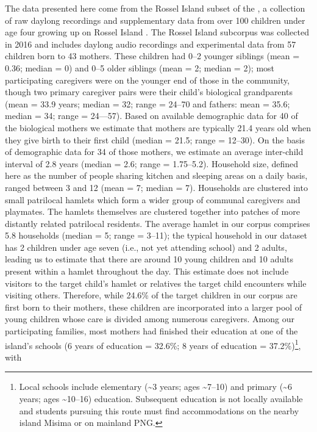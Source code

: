 \documentclass[,man,floatsintext]{apa6}
\let\rmarkdownfootnote\footnote%
\def\footnote{\protect\rmarkdownfootnote}
\begin{document}
The data presented here come from the Rossel Island subset of the , a
collection of raw daylong recordings and supplementary data from over
100 children under age four growing up on Rossel Island . The Rossel
Island subcorpus was collected in 2016 and includes daylong audio
recordings and experimental data from 57 children born to 43 mothers.
These children had 0--2 younger siblings (mean = 0.36; median = 0) and
0--5 older siblings (mean = 2; median = 2); most participating
caregivers were on the younger end of those in the community, though two
primary caregiver pairs were their child's biological grandparents (mean
= 33.9 years; median = 32; range = 24--70 and fathers: mean = 35.6;
median = 34; range = 24---57). Based on available demographic data for
40 of the biological mothers we estimate that mothers are typically 21.4
years old when they give birth to their first child (median = 21.5;
range = 12--30). On the basis of demographic data for 34 of those
mothers, we estimate an average inter-child interval of 2.8 years
(median = 2.6; range = 1.75--5.2). Household size, defined here as the
number of people sharing kitchen and sleeping areas on a daily basis,
ranged between 3 and 12 (mean = 7; median = 7). Households are clustered
into small patrilocal hamlets which form a wider group of communal
caregivers and playmates. The hamlets themselves are clustered together
into patches of more distantly related patrilocal residents. The average
hamlet in our corpus comprises 5.8 households (median = 5; range =
3--11); the typical household in our dataset has 2 children under age
seven (i.e., not yet attending school) and 2 adults, leading us to
estimate that there are around 10 young children and 10 adults present
within a hamlet throughout the day. This estimate does not include
visitors to the target child's hamlet or relatives the target child
encounters while visiting others. Therefore, while 24.6\% of the target
children in our corpus are first born to their mothers, these children
are incorporated into a larger pool of young children whose care is
divided among numerous caregivers. Among our participating families,
most mothers had finished their education at one of the island's schools
(6 years of education = 32.6\%; 8 years of education = 37.2\%)\footnote{Local
  schools include elementary (\textasciitilde{}3 years; ages
  \textasciitilde{}7--10) and primary (\textasciitilde{}6 years; ages
  \textasciitilde{}10--16) education. Subsequent education is not
  locally available and students pursuing this route must find
  accommodations on the nearby island Misima or on mainland PNG.}, with
\end{document}
